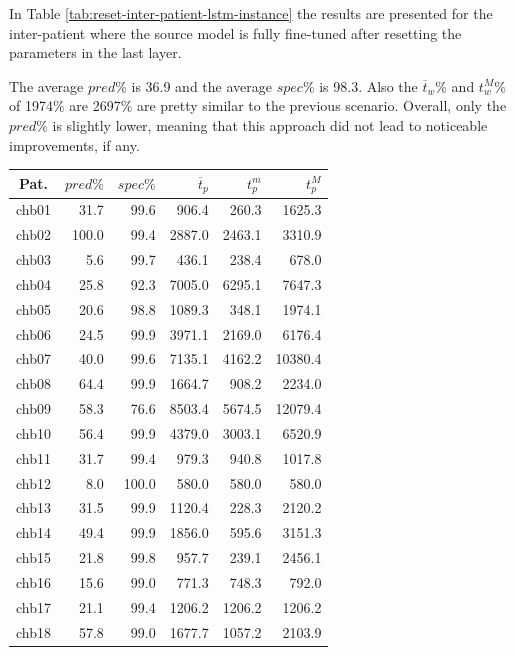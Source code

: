 In Table \ref{tab:reset-inter-patient-lstm-instance} the results are presented for the inter-patient where the source model is fully fine-tuned after resetting the parameters in the last layer.

The average $pred\%$ is 36.9 and the average $spec\%$ is 98.3. Also the $\overline{t}_w\%$ and $t_w^M\%$  of 1974\% are 2697\% are pretty similar to the previous scenario. Overall, only the $pred\%$ is slightly lower, meaning that this approach did not lead to noticeable improvements, if any.

\begin{table}[ht]
    \centering
    \begin{tabular}{c|rrrrr}
    Pat.  & $pred\%$ & $spec\%$ & $\overline{t}_p$   & $t_p^m$  & $t_p^M$   \\ \hline
    chb01   & 31.7   & 99.6   & 906.4   & 260.3   & 1625.3  \\
    chb02   & 100.0  & 99.4   & 2887.0  & 2463.1  & 3310.9  \\
    chb03   & 5.6    & 99.7   & 436.1   & 238.4   & 678.0   \\
    chb04   & 25.8   & 92.3   & 7005.0  & 6295.1  & 7647.3  \\
    chb05   & 20.6   & 98.8   & 1089.3  & 348.1   & 1974.1  \\
    chb06   & 24.5   & 99.9   & 3971.1  & 2169.0  & 6176.4  \\
    chb07   & 40.0   & 99.6   & 7135.1  & 4162.2  & 10380.4 \\
    chb08   & 64.4   & 99.9   & 1664.7  & 908.2   & 2234.0  \\
    chb09   & 58.3   & 76.6   & 8503.4  & 5674.5  & 12079.4 \\
    chb10   & 56.4   & 99.9   & 4379.0  & 3003.1  & 6520.9  \\
    chb11   & 31.7   & 99.4   & 979.3   & 940.8   & 1017.8  \\
    chb12   & 8.0    & 100.0  & 580.0   & 580.0   & 580.0   \\
    chb13   & 31.5   & 99.9   & 1120.4  & 228.3   & 2120.2  \\
    chb14   & 49.4   & 99.9   & 1856.0  & 595.6   & 3151.3  \\
    chb15   & 21.8   & 99.8   & 957.7   & 239.1   & 2456.1  \\
    chb16   & 15.6   & 99.0   & 771.3   & 748.3   & 792.0   \\
    chb17   & 21.1   & 99.4   & 1206.2  & 1206.2  & 1206.2  \\
    chb18   & 57.8   & 99.0   & 1677.7  & 1057.2  & 2103.9  \\

\end{tabular}
\end{table}
